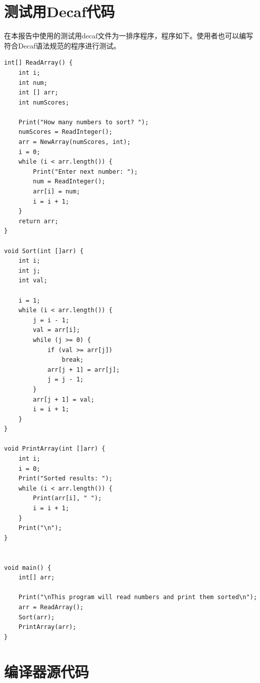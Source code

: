 \documentclass{report}
\begin{document}
\chapter{测试用Decaf代码}
\label{cha:ce_shi_yong_decafdai_ma_}
\par 在本报告中使用的测试用decaf文件为一排序程序，程序如下。使用者也可以编写符合Decaf语法规范的程序进行测试。
\begin{lstlisting}
int[] ReadArray() {
    int i;
    int num;
    int [] arr;
    int numScores;

    Print("How many numbers to sort? ");
    numScores = ReadInteger();
    arr = NewArray(numScores, int);
    i = 0;
    while (i < arr.length()) {
        Print("Enter next number: ");
        num = ReadInteger();
        arr[i] = num;
        i = i + 1;
    }
    return arr;
}

void Sort(int []arr) {
    int i;
    int j;
    int val;

    i = 1;
    while (i < arr.length()) {
        j = i - 1;
        val = arr[i];
        while (j >= 0) {
            if (val >= arr[j])
                break;
            arr[j + 1] = arr[j];
            j = j - 1;
        }
        arr[j + 1] = val;
        i = i + 1;
    }
}

void PrintArray(int []arr) {
    int i;
    i = 0;
    Print("Sorted results: ");
    while (i < arr.length()) {
        Print(arr[i], " ");
        i = i + 1;
    }
    Print("\n");
}


void main() {
    int[] arr;

    Print("\nThis program will read numbers and print them sorted\n");
    arr = ReadArray();
    Sort(arr);
    PrintArray(arr);
}
\end{lstlisting}

{\let\clearpage\relax \chapter{编译器源代码}}
\label{cha:bian_yi_qi_yuan_dai_ma_}
\end{document}
